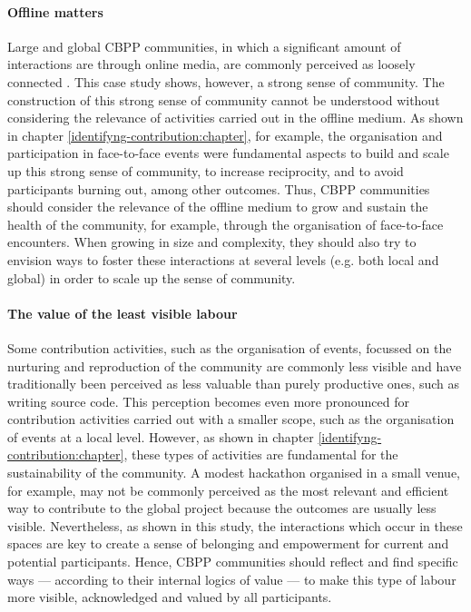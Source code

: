 \paragraph*{Offline matters}

Large and global CBPP communities, in which a significant amount of interactions are through online media, are commonly perceived as loosely connected \parencite[e.g.][60]{benkler2006wealth}. This case study shows, however, a strong sense of community. The construction of this strong sense of community cannot be understood without considering the relevance of activities carried out in the offline medium. As shown in chapter \ref{identifyng-contribution:chapter}, for example, the organisation and participation in face-to-face events were fundamental aspects to build and scale up this strong sense of community, to increase reciprocity, and to avoid participants burning out, among other outcomes. Thus, CBPP communities should consider the relevance of the offline medium to grow and sustain the health of the community, for example, through the organisation of face-to-face encounters. When growing in size and complexity, they should also try to envision ways to foster these interactions at several levels (e.g. both local and global) in order to scale up the sense of community.

\paragraph*{The value of the least visible labour}

Some contribution activities, such as the organisation of events, focussed on the nurturing and reproduction of the community are commonly less visible and have traditionally been perceived as less valuable than purely productive ones, such as writing source code. This perception becomes even more pronounced for contribution activities carried out with a smaller scope, such as the organisation of events at a local level. However, as shown in chapter \ref{identifyng-contribution:chapter}, these types of activities are fundamental for the sustainability of the community. A modest hackathon organised in a small venue, for example, may not be commonly perceived as the most relevant and efficient way to contribute to the global project because the outcomes are usually less visible. Nevertheless, as shown in this study, the interactions which occur in these spaces are key to create a sense of belonging and empowerment for current and potential participants. Hence, CBPP communities should reflect and find specific ways --- according to their internal logics of value --- to make this type of labour more visible, acknowledged and valued by all participants.

